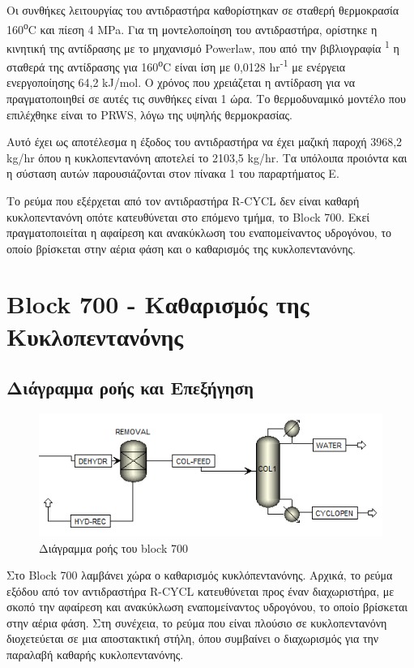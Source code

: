 \documentclass[11pt]{article}
\makeatletter
\newcommand{\citeprocitem}[2]{\hyper@linkstart{cite}{citeproc_bib_item_#1}#2\hyper@linkend}
\makeatother
\begin{document}
Οι συνθήκες λειτουργίας του αντιδραστήρα καθορίστηκαν σε σταθερή
θερμοκρασία 160\textsuperscript{ο}C και πίεση 4 MPa. Για τη μοντελοποίηση του
αντιδραστήρα, ορίστηκε η κινητική της αντίδρασης με το μηχανισμό
Powerlaw, που από την βιβλιογραφία \textsuperscript{\citeprocitem{1}{1}} η σταθερά της
αντίδρασης για 160\textsuperscript{ο}C είναι ίση με 0,0128 hr\textsuperscript{-1} με ενέργεια
ενεργοποίησης 64,2 kJ/mol. Ο χρόνος που χρειάζεται η αντίδραση για να
πραγματοποιηθεί σε αυτές τις συνθήκες είναι 1 ώρα. Το θερμοδυναμικό
μοντέλο που επιλέχθηκε είναι το PRWS, λόγω της υψηλής θερμοκρασίας.

Αυτό έχει ως αποτέλεσμα η έξοδος του αντιδραστήρα να έχει μαζική παροχή
3968,2 kg/hr όπου η κυκλοπεντανόνη αποτελεί το 2103,5 kg/hr. Τα υπόλοιπα
προιόντα και η σύσταση αυτών παρουσιάζονται στον πίνακα 1 του
παραρτήματος Ε.

Το ρεύμα που εξέρχεται από τον αντιδραστήρα R-CYCL δεν είναι καθαρή
κυκλοπεντανόνη οπότε κατευθύνεται στο επόμενο τμήμα, το Block 700. Εκεί
πραγματοποιείται η αφαίρεση και ανακύκλωση του εναπομείναντος υδρογόνου,
το οποίο βρίσκεται στην αέρια φάση και ο καθαρισμός της κυκλοπεντανόνης.

\section{Block 700 - Καθαρισμός της Κυκλοπεντανόνης}
\label{sec:org5e03e00}
\subsection{Διάγραμμα ροής και Επεξήγηση}
\label{sec:org0e8727a}
\begin{figure}[htbp]
\centering
\includegraphics[width=.9\linewidth]{Block_700_-_Καθαρισμός_της_Κυκλοπεντανόνης/2023-01-13_18-02-03_screenshot.png}
\caption{Διάγραμμα ροής του block 700}
\end{figure}

Στο Block 700 λαμβάνει χώρα ο καθαρισμός κυκλόπεντανόνης. Αρχικά, το
ρεύμα εξόδου από τον αντιδραστήρα R-CYCL κατευθύνεται προς έναν
διαχωριστήρα, με σκοπό την αφαίρεση και ανακύκλωση εναπομείναντος
υδρογόνου, το οποίο βρίσκεται στην αέρια φάση. Στη συνέχεια, το ρεύμα
που είναι πλούσιο σε κυκλοπεντανόνη διοχετεύεται σε μια αποστακτική
στήλη, όπου συμβαίνει ο διαχωρισμός για την παραλαβή καθαρής
κυκλοπεντανόνης.
\end{document}
